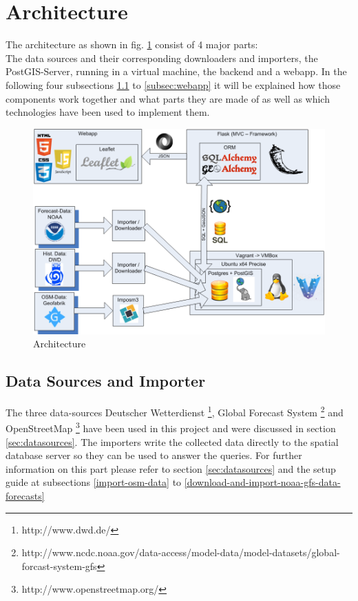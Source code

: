 \documentclass[paper=a4, fontsize=11pt]{article} %
\numberwithin{equation}{section} %
\numberwithin{figure}{section} %
\numberwithin{table}{section} %
\begin{document}
\section{Architecture}
The architecture as shown in fig. \ref{fig:architecture} consist of 4 major parts:\\
The data sources and their corresponding downloaders and importers, the PostGIS-Server, running in a virtual machine, the backend and a webapp. In the following four subsections \ref{subsec:dsai} to \ref{subsec:webapp} it will be  explained how those components work together and what parts they are made of as well as which technologies have been used to implement them.
\begin{figure}[htbp]
\includegraphics[width=1\textwidth]{pictures/Architektur.png}
\caption{Architecture}
\label{fig:architecture}
\end{figure}

\subsection{Data Sources and Importer}\label{subsec:dsai}
The three data-sources Deutscher Wetterdienst \footnote{http://www.dwd.de/}, Global Forecast System \footnote{http://www.ncdc.noaa.gov/data-access/model-data/model-datasets/global-forcast-system-gfs} and OpenStreetMap \footnote{http://www.openstreetmap.org/} have been used in this project and were discussed in section \ref{sec:datasources}. The importers write the collected data directly to the spatial database server so they can be used to answer the queries. For further information on this part please refer to section \ref{sec:datasources} and the setup guide at subsections \ref{import-osm-data} to \ref{download-and-import-noaa-gfs-data-forecasts}
\end{document}

